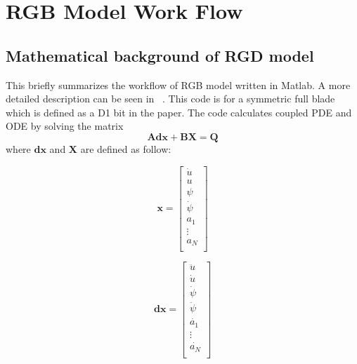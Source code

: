 \chapter{RGB Model Work Flow}
\section{Mathematical background of RGD model}
\label{ap:rgbworkflow}
This \appendixname{} briefly summarizes the workflow of RGB model written in Matlab. A more detailed description can be seen in ~\cite{ref:zhang2020a}. This code is for a symmetric full blade which is defined as a D1 bit in the paper. The code calculates coupled PDE and ODE by solving the matrix
\begin{equation}\label{matrix}
  \bm{Adx} + \bm{BX} = \bm{Q}
\end{equation}
where $\bm{dx}$ and $\bm{X}$ are defined as follow:

\vspace{\abovedisplayskip}
\noindent\begin{minipage}{.4\linewidth}
\begin{equation}
\bm{x}=
\begin{bmatrix}
\dot{u} \\
u \\
\psi \\
\dot{\psi} \\
a_1\ \\
\vdots \\
a_N \\
\end{bmatrix}
\end{equation}
\end{minipage}%
\hfill
\begin{minipage}{.4\linewidth}
\begin{equation}
\bm{dx}=
\begin{bmatrix}
\ddot{u} \\
\dot{u} \\
\dot{\psi} \\
\ddot{\psi} \\
\dot{a_1}\ \\
\vdots \\
\dot{a_N} \\
\end{bmatrix}
\end{equation}
\end{minipage}
\vspace{\belowdisplayskip}


